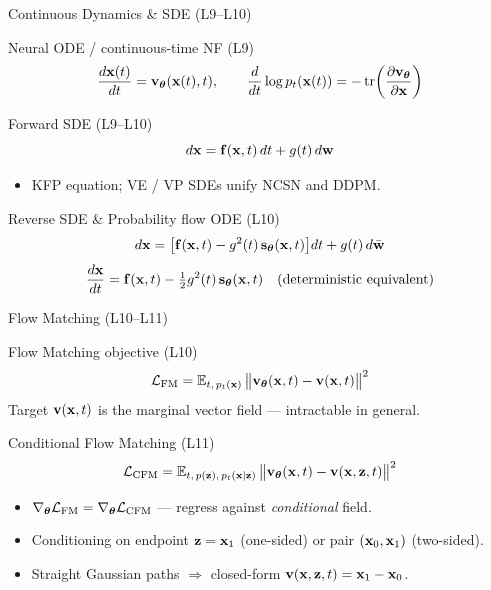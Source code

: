 \documentclass{beamer}
\begin{document}
\begin{frame}{Continuous Dynamics \& SDE (L9--L10)}
	\begin{block}{Neural ODE / continuous-time NF (L9)}
		\vspace{-0.3cm}
		\[
			\frac{d\mathbf{x}(t)}{dt} = \mathbf{v}_{\boldsymbol{\theta}}(\mathbf{x}(t),t),
			\qquad
			\frac{d}{dt}\log p_t(\mathbf{x}(t)) = -\operatorname{tr}\!\left(\frac{\partial \mathbf{v}_{\boldsymbol{\theta}}}{\partial \mathbf{x}}\right)
		\]
	\end{block}
	\begin{block}{Forward SDE (L9--L10)}
		\vspace{-0.3cm}
		\[
			d\mathbf{x} = \mathbf{f}(\mathbf{x},t)\,dt + g(t)\,d\mathbf{w}
		\]
		\vspace{-0.7cm}
		\begin{itemize}
			\item KFP equation; VE / VP SDEs unify NCSN and DDPM.
		\end{itemize}
	\end{block}
	\begin{block}{Reverse SDE \& Probability flow ODE (L10)}
		\vspace{-0.3cm}
		\[
			d\mathbf{x} = \bigl[\mathbf{f}(\mathbf{x},t) - g^2(t)\,\mathbf{s}_{\boldsymbol{\theta}}(\mathbf{x},t)\bigr] dt + g(t)\, d\bar{\mathbf{w}}
		\]
		\vspace{-0.6cm}
		\[
			\frac{d\mathbf{x}}{dt} = \mathbf{f}(\mathbf{x},t) - \tfrac{1}{2}g^2(t)\,\mathbf{s}_{\boldsymbol{\theta}}(\mathbf{x},t)
			\quad (\text{deterministic equivalent})
		\]
	\end{block}
\end{frame}
\begin{frame}{Flow Matching (L10--L11)}
	\begin{block}{Flow Matching objective (L10)}
		\vspace{-0.3cm}
		\[
			\mathcal{L}_{\text{FM}} = \mathbb{E}_{t,\,p_t(\mathbf{x})}\,\bigl\|\mathbf{v}_{\boldsymbol{\theta}}(\mathbf{x},t) - \mathbf{v}(\mathbf{x},t)\bigr\|^2
		\]
		Target $\mathbf{v}(\mathbf{x},t)$ is the marginal vector field --- intractable in general.
	\end{block}
	\begin{block}{Conditional Flow Matching (L11)}
		\vspace{-0.3cm}
		\[
			\mathcal{L}_{\text{CFM}} = \mathbb{E}_{t,\,p(\mathbf{z}),\,p_t(\mathbf{x}|\mathbf{z})}\,\bigl\|\mathbf{v}_{\boldsymbol{\theta}}(\mathbf{x},t) - \mathbf{v}(\mathbf{x},\mathbf{z},t)\bigr\|^2
		\]
		\vspace{-0.5cm}
		\begin{itemize}
			\item $\nabla_{\boldsymbol{\theta}}\mathcal{L}_{\text{FM}} = \nabla_{\boldsymbol{\theta}}\mathcal{L}_{\text{CFM}}$ --- regress against \emph{conditional} field.
			\item Conditioning on endpoint $\mathbf{z}=\mathbf{x}_1$ (one-sided) or pair $(\mathbf{x}_0,\mathbf{x}_1)$ (two-sided).
			\item Straight Gaussian paths $\Rightarrow$ closed-form $\mathbf{v}(\mathbf{x},\mathbf{z},t) = \mathbf{x}_1 - \mathbf{x}_0$.
		\end{itemize}
	\end{block}
\end{frame}
\end{document}
